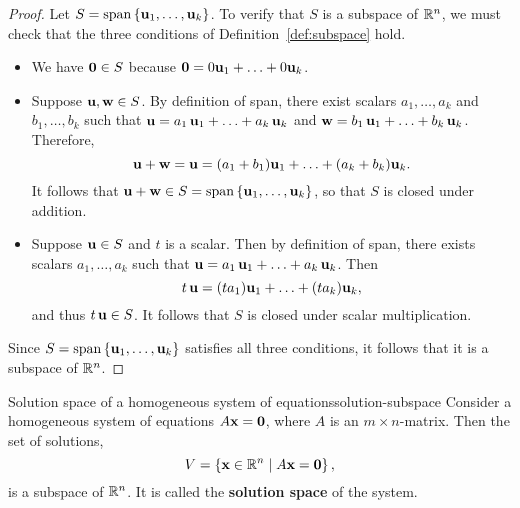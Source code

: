 \begin{proof}
  Let $S=\sspan\set{\vect{u}_1,\ldots,\vect{u}_k}$. To verify that $S$
  is a subspace of $\mathbb{R}^{n}$, we must check that the three conditions
  of Definition~\ref{def:subspace} hold.
  \begin{itemize}
  \item We have $\mbox{\bf 0}\in S$ because
    $\mbox{\bf 0}=0\mbox{\bf u}_1+\ldots+0\mbox{\bf u}_k$. 
  \item Suppose $\mbox{\bf u},\mbox{\bf w}\in S$.
    By definition of span, there exist scalars $a_1,\ldots,a_k$ and
    $b_1,\ldots,b_k$ such that
    $\mbox{\bf u}=a_1\,\mbox{\bf u}_1+\ldots+a_k\,\mbox{\bf u}_k$ and
    $\mbox{\bf w}=b_1\,\mbox{\bf u}_1+\ldots+b_k\,\mbox{\bf u}_k$.
    Therefore,
    \begin{equation*}
      \mbox{\bf u}+\mbox{\bf w} = \mbox{\bf u}=(a_1+b_1)\mbox{\bf u}_1+\ldots+(a_k+b_k)\mbox{\bf u}_k.
    \end{equation*}
    It follows that
    $\vect{u}+\vect{w}\in S=\sspan\set{\vect{u}_1,\ldots,\vect{u}_k}$,
    so that $S$ is closed under addition.
  \item Suppose $\mbox{\bf u}\in S$ and $t$ is a scalar. Then by
    definition of span, there exists scalars $a_1,\ldots,a_k$ such
    that $\mbox{\bf u}=a_1\,\mbox{\bf u}_1+\ldots+a_k\,\mbox{\bf u}_k$. Then
    \begin{equation*}
      t\,\mbox{\bf u}=(ta_1)\mbox{\bf u}_1+\ldots+(ta_k)\mbox{\bf u}_k,
    \end{equation*}
    and thus $t\,\mbox{\bf u}\in S$. It follows that $S$ is closed under
    scalar multiplication.
  \end{itemize}
  Since $S=\sspan\set{\vect{u}_1,\ldots,\vect{u}_k}$ satisfies all
  three conditions, it follows that it is a subspace of $\mathbb{R}^n$.
\end{proof}

\begin{proposition}{Solution space of a homogeneous system of equations}{solution-subspace}
  Consider a homogeneous system of equations $A\mbox{\bf x} = \mbox{\bf 0}$,
  where $A$ is an $m\times n$-matrix. Then the set of solutions,
  \begin{equation*}
    V=\left\{\mbox{\bf x}\in\mathbb{R}^n \mid A\mbox{\bf x} = \mbox{\bf 0}\right\},
  \end{equation*}
  is a subspace of $\mathbb{R}^n$. It is called the \textbf{solution space} of
  the system.%
\end{proposition}

